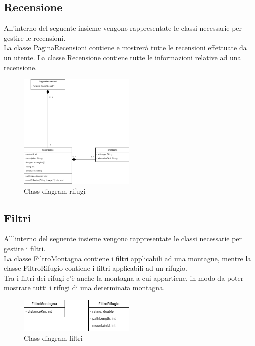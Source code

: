 \documentclass[a4paper,12pt]{article}
\begin{document}
\subsection{Recensione}
All'interno del seguente insieme vengono rappresentate le classi necessarie per gestire le recensioni.
\\ La classe PaginaRecensioni contiene e mostrerà tutte le recensioni effettuate da un utente. La classe Recensione contiene tutte le informazioni relative ad una recensione.
\begin{figure}[H]
   \centering
   \includegraphics[width=0.5\textwidth] {D3/img/class_diagram_reviews.png}
    \caption{Class diagram rifugi}
\end{figure}

\subsection{Filtri}
All'interno del seguente insieme vengono rappresentate le classi necessarie per gestire i filtri.
\\ La classe FiltroMontagna contiene i filtri applicabili ad una montagne, mentre la classe FiltroRifugio contiene i filtri applicabili ad un rifugio.\\
Tra i filtri dei rifugi c'è anche la montagna a cui appartiene, in modo da poter mostrare tutti i rifugi di una determinata montagna.
\begin{figure}[H]
   \centering
   \includegraphics[width=0.5\textwidth] {D3/img/class_diagram_filters.png}
    \caption{Class diagram filtri}
\end{figure}
\end{document}
